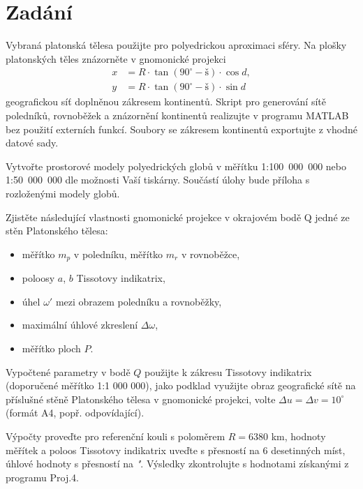 \section{Zadání}
Vybraná platonská tělesa použijte pro polyedrickou aproximaci sféry. Na plošky platonských těles znázorněte v gnomonické projekci
\begin{align*}
x &= R \cdot \tan (90^{\circ} - \textit{š}) \cdot \cos d, \\
y &= R \cdot \tan (90^{\circ} - \textit{š}) \cdot \sin d
\end{align*}
geografickou síť doplněnou zákresem kontinentů. Skript pro generování sítě poledníků, rovnoběžek a znázornění kontinentů realizujte v programu MATLAB bez použití externích funkcí. Soubory se zákresem kontinentů exportujte z vhodné datové sady.

Vytvořte prostorové modely polyedrických globů v měřítku 1:100~000~000 nebo 1:50~000~000 dle možnosti Vaší tiskárny. Součástí úlohy bude příloha s rozloženými modely globů.

Zjistěte následující vlastnosti gnomonické projekce v okrajovém bodě Q jedné ze stěn Platonského tělesa:

\begin{itemize}
    \item měřítko $m_p$ v poledníku, měřítko $m_r$ v rovnoběžce,
    \item poloosy $a$, $b$ Tissotovy indikatrix,
    \item úhel $\omega'$ mezi obrazem poledníku a rovnoběžky,
    \item maximální úhlové zkreslení $\Delta\omega$,
    \item měřítko ploch $P$.
\end{itemize}

Vypočtené parametry v bodě $Q$ použijte k zákresu Tissotovy indikatrix (doporučené měřítko 1:1 000 000), jako podklad využijte obraz geografické sítě na příslušné stěně Platonského tělesa v gnomonické projekci, volte $\Delta u = \Delta v = 10^{\circ}$ (formát A4, popř. odpovídající).

Výpočty proveďte pro referenční kouli s poloměrem $R=6380$ km, hodnoty měřítek a poloos Tissotovy indikatrix uveďte s přesností na 6 desetinných míst, úhlové hodnoty s přesností na \textit{"}. Výsledky zkontrolujte s hodnotami získanými z programu Proj.4.


